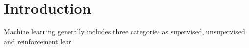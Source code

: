 \section{Introduction}

Machine learning generally includes three categories as supervised, unsupervised and reinforcement lear
